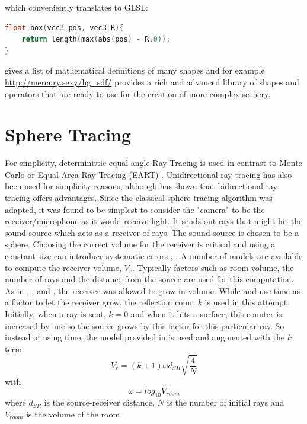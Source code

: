 \documentclass[twoside,a4paper]{article}
\begin{document}
which conveniently translates to GLSL:

\begin{lstlisting}[language=C, caption={\it GLSL code for creating a box SDF},captionpos=b, label=lst:boxSdf]
float box(vec3 pos, vec3 R){
    return length(max(abs(pos) - R,0));
}
\end{lstlisting}

\cite{hart_sphere_1996} gives a list of mathematical definitions of many shapes and for example \href{http://mercury.sexy/hg_sdf/}{http://mercury.sexy/hg\_sdf/} provides a rich and advanced library of shapes and operators that are ready to use for the creation of more complex scenery.


\section{Sphere Tracing}
For simplicity, deterministic equal-angle Ray Tracing is used in contrast to Monte Carlo or Equal Area Ray Tracing (EART) \cite{gu_room_2014}. Unidirectional ray tracing has also been used for simplicity reasons, although \cite{cao_interactive_2016} has shown that bidirectional ray tracing offers advantages. Since the classical sphere tracing algorithm was adapted, it was found to be simplest to consider the "camera" to be the receiver/microphone as it would receive light. It sends out rays that might hit the sound source which acts as a receiver of rays. The sound source is chosen to be a sphere. Choosing the correct volume for the receiver is critical and using a constant size can introduce systematic errors \cite{xiangyang_accuracy_2003}, \cite{alpkocak_computing_2010}. A number of models are available to compute the receiver volume, $V_r$. Typically factors such as room volume, the number of rays and the distance from the source are used for this computation. 
As in \cite{brandao_ray_nodate}, \cite{alpkocak_computing_2010}, and \cite{dalenback_room_1996}, the receiver was allowed to grow in volume. While \cite{brandao_ray_nodate} and \cite{dalenback_room_1996} use time as a factor to let the receiver grow, the reflection count $k$ is used in this attempt. Initially, when a ray is sent, $k=0$ and when it hits a surface, this counter is increased by one so the source grows by this factor for this particular ray. So instead of using time, the model provided in \cite{alpkocak_computing_2010} is used and augmented with the $k$ term:
\begin{equation}
V_r = (k+1) \omega d_{SR}\sqrt{\frac{4}{N}}
\end{equation}
with 
\begin{equation}
\omega = log_{10}{V_{room}}
\end{equation}
where $d_{SR}$ is the source-receiver distance, $N$ is the number of initial rays and $V_{room}$ is the volume of the room.\
\end{document}
